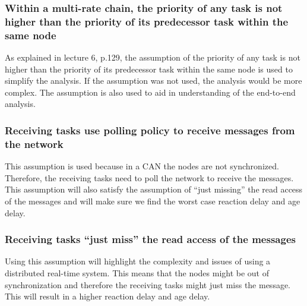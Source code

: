             \subsubsection*{Within a multi-rate chain, the priority of any task is not higher than the priority of its predecessor task within the same node}
                As explained in lecture 6, p.129, the assumption of the priority of any task is not higher than the priority of its predecessor task within the same node is used to simplify the analysis. If the assumption was not used, the analysis would be more complex. The assumption is also used to aid in understanding of the end-to-end analysis.

            \subsubsection*{Receiving tasks use polling policy to receive messages from the network}
                This assumption is used because in a CAN the nodes are not synchronized. Therefore, the receiving tasks need to poll the network to receive the messages. This assumption will also satisfy the assumption of “just missing” the read access of the messages and will make sure we find the worst case reaction delay and age delay.

            \subsubsection*{Receiving tasks “just miss” the read access of the messages}
                Using this assumption will highlight the complexity and issues of using a distributed real-time system. This means that the nodes might be out of synchronization and therefore the receiving tasks might just miss the message. This will result in a higher reaction delay and age delay.
        





  




